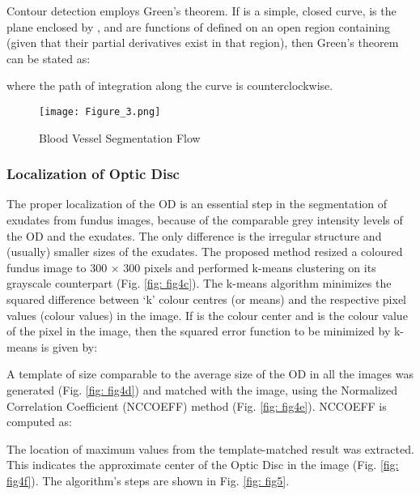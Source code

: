 \documentclass{svproc}
\begin{document}
Contour detection employs Green’s theorem. If  is a simple, closed curve,  is the plane enclosed by ,  and  are functions of  defined on an open region containing  (given that their partial derivatives exist in that region), then Green’s theorem can be stated as:





where the path of integration along the curve  is counterclockwise.


\begin{figure}
    \centering
    \texttt{[image: Figure\_3.png]}
    \caption{Blood Vessel Segmentation Flow}
    \label{fig: fig3}
\end{figure}

\subsubsection{Localization of Optic Disc}

The proper localization of the OD is an essential step in the segmentation of exudates from fundus images, because of the comparable grey intensity levels of the OD and the exudates. The only difference is the irregular structure and (usually) smaller sizes of the exudates. The proposed method resized a coloured fundus image to 300 × 300 pixels and performed k-means clustering on its grayscale counterpart (Fig. \ref{fig: fig4c}). The k-means algorithm minimizes the squared difference between ‘k’ colour centres (or means) and the respective pixel values (colour values) in the image. If  is the  colour center and  is the colour value of the  pixel in the image, then the squared error function  to be minimized by k-means is given by:

\vspace{-1mm}



A template of size comparable to the average size of the OD in all the images was generated (Fig. \ref{fig: fig4d}) and matched with the image, using the Normalized Correlation Coefficient (NCCOEFF) method (Fig. \ref{fig: fig4e}). NCCOEFF is computed as:

\vspace{-2mm}


The location of maximum values from the template-matched result was extracted. This indicates the approximate center of the Optic Disc in the image (Fig. \ref{fig: fig4f}). The algorithm's steps are shown in Fig. \ref{fig: fig5}.
\end{document}
